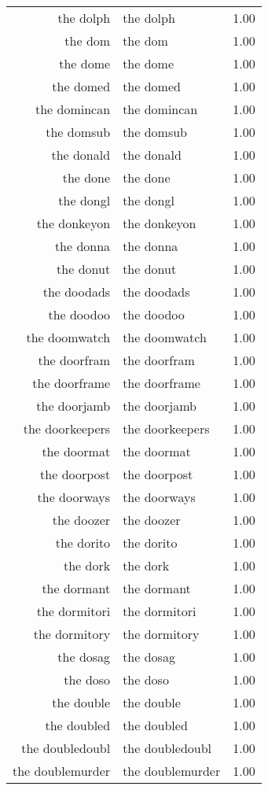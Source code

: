 \begin{table}[ht]
\begin{tabular}{rlr}
  the dolph & the dolph & 1.00 \\ 
  the dom & the dom & 1.00 \\ 
  the dome & the dome & 1.00 \\ 
  the domed & the domed & 1.00 \\ 
  the domincan & the domincan & 1.00 \\ 
  the domsub & the domsub & 1.00 \\ 
  the donald & the donald & 1.00 \\ 
  the done & the done & 1.00 \\ 
  the dongl & the dongl & 1.00 \\ 
  the donkeyon & the donkeyon & 1.00 \\ 
  the donna & the donna & 1.00 \\ 
  the donut & the donut & 1.00 \\ 
  the doodads & the doodads & 1.00 \\ 
  the doodoo & the doodoo & 1.00 \\ 
  the doomwatch & the doomwatch & 1.00 \\ 
  the doorfram & the doorfram & 1.00 \\ 
  the doorframe & the doorframe & 1.00 \\ 
  the doorjamb & the doorjamb & 1.00 \\ 
  the doorkeepers & the doorkeepers & 1.00 \\ 
  the doormat & the doormat & 1.00 \\ 
  the doorpost & the doorpost & 1.00 \\ 
  the doorways & the doorways & 1.00 \\ 
  the doozer & the doozer & 1.00 \\ 
  the dorito & the dorito & 1.00 \\ 
  the dork & the dork & 1.00 \\ 
  the dormant & the dormant & 1.00 \\ 
  the dormitori & the dormitori & 1.00 \\ 
  the dormitory & the dormitory & 1.00 \\ 
  the dosag & the dosag & 1.00 \\ 
  the doso & the doso & 1.00 \\ 
  the double & the double & 1.00 \\ 
  the doubled & the doubled & 1.00 \\ 
  the doubledoubl & the doubledoubl & 1.00 \\ 
  the doublemurder & the doublemurder & 1.00 \\ 

\end{tabular}
\end{table}
